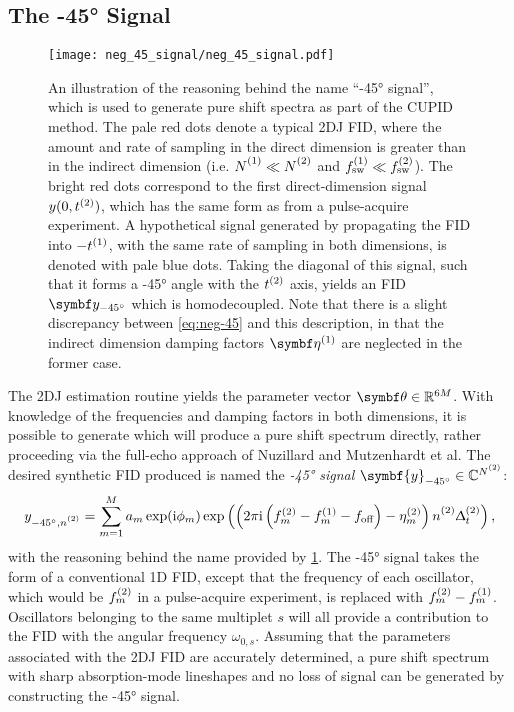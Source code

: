 \subsection{The \ang{-45} Signal}
\begin{figure}
    \centering
    \texttt{[image: neg\_45\_signal/neg\_45\_signal.pdf]}
    \caption[
        An illustration of the reasoning behind the name ``\ang{-45}
        signal'' used to generate pure shift spectra as part of the \acs{CUPID}
        method.
    ]{
        An illustration of the reasoning behind the name ``\ang{-45}
        signal'', which is used to generate pure shift spectra as part of the
        \ac{CUPID} method. The pale red
        dots denote
        a typical \ac{2DJ} \ac{FID}, where
        the amount and rate of sampling in the direct dimension is greater than
        in the indirect dimension (i.e. $\None \ll \Ntwo$ and $f_{\mathrm{sw}}^{(1)} \ll
        f_{\mathrm{sw}}^{(2)}$). The bright red dots correspond to the first direct-dimension
        signal $y(0,t^{(2)})$, which has the same form as
         from a pulse-acquire experiment. A hypothetical signal
        generated by propagating the \ac{FID} into $-t^{(1)}$, with the same rate
        of sampling in both dimensions, is denoted with pale blue dots. Taking
        the diagonal of this signal, such that it forms a \ang{-45} angle with the
        $t^{(2)}$ axis, yields an \ac{FID} $\by_{\ang{-45}}$  which is
        homodecoupled. Note that there is a slight discrepancy
        between \cref{eq:neg-45} and this description, in that the
        indirect dimension damping factors $\bdetaone$ are neglected in the
        former case.
    }
    \label{fig:neg-45}
\end{figure}
The \ac{2DJ} estimation routine yields the parameter vector $\bth \in
\mathbb{R}^{6M}$. With
knowledge of the frequencies and damping factors in both dimensions, it is
possible to generate  which will produce a pure shift spectrum
directly, rather proceeding via the full-echo approach of Nuzillard and
Mutzenhardt et al.
The desired synthetic \ac{FID} produced is named the \emph{\ang{-45} signal}
$\symbf{y}_{\ang{-45}} \in \mathbb{C}^{\Ntwo}$:
\begin{equation}
    y_{\ang{-45},\ntwo} =
        \sum_{m=1}^{M} a_m \exp (\iu \phi_m)
        \exp\left(\left(2 \pi \iu \left(\ftwo_m - \fone_m - \foff\right)
                - \etatwo_m
            \right) \ntwo \Dttwo
        \right),
    \label{eq:neg-45}
\end{equation}
with the reasoning behind the name provided by \cref{fig:neg-45}.
The \ang{-45} signal
takes the form of a conventional \ac{1D} \ac{FID},
except that the frequency of each oscillator, which would be $f^{(2)}_m$ in a
pulse-acquire experiment,
is replaced with $f^{(2)}_m - f^{(1)}_m$. Oscillators belonging to the same
multiplet $s$ will all provide a contribution to the \ac{FID} with the
angular frequency $\omega_{0,s}$.
Assuming that the parameters associated with the \ac{2DJ}
\ac{FID} are accurately determined, a pure shift spectrum with sharp
absorption-mode lineshapes and no loss of signal can be generated by
constructing the \ang{-45} signal.


